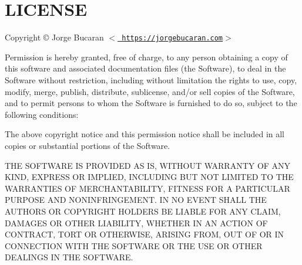 \chapter{LICENSE}
\hypertarget{md_pkiclassroomrescheduler_2src_2main_2frontend_2node__modules_2colorette_2_l_i_c_e_n_s_e}{}\label{md_pkiclassroomrescheduler_2src_2main_2frontend_2node__modules_2colorette_2_l_i_c_e_n_s_e}
Copyright © Jorge Bucaran \texorpdfstring{$<$}{<}\href{https://jorgebucaran.com}{\texttt{ https\+://jorgebucaran.\+com}}\texorpdfstring{$>$}{>}

Permission is hereby granted, free of charge, to any person obtaining a copy of this software and associated documentation files (the \textquotesingle{}Software\textquotesingle{}), to deal in the Software without restriction, including without limitation the rights to use, copy, modify, merge, publish, distribute, sublicense, and/or sell copies of the Software, and to permit persons to whom the Software is furnished to do so, subject to the following conditions\+:

The above copyright notice and this permission notice shall be included in all copies or substantial portions of the Software.

THE SOFTWARE IS PROVIDED \textquotesingle{}AS IS\textquotesingle{}, WITHOUT WARRANTY OF ANY KIND, EXPRESS OR IMPLIED, INCLUDING BUT NOT LIMITED TO THE WARRANTIES OF MERCHANTABILITY, FITNESS FOR A PARTICULAR PURPOSE AND NONINFRINGEMENT. IN NO EVENT SHALL THE AUTHORS OR COPYRIGHT HOLDERS BE LIABLE FOR ANY CLAIM, DAMAGES OR OTHER LIABILITY, WHETHER IN AN ACTION OF CONTRACT, TORT OR OTHERWISE, ARISING FROM, OUT OF OR IN CONNECTION WITH THE SOFTWARE OR THE USE OR OTHER DEALINGS IN THE SOFTWARE. 